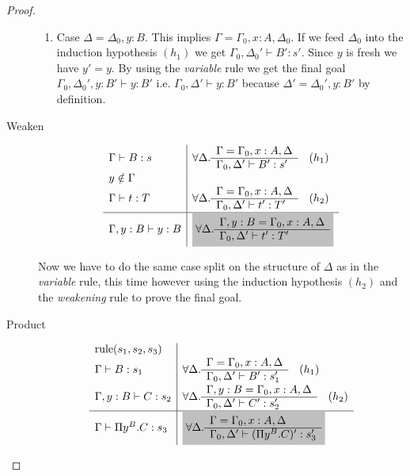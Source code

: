 \documentclass[12pt]{article}
\begin{document}
\begin{theorem}
\begin{proof}
\begin{description}
\begin{enumerate}
      \item Case $\Delta = \Delta_0,y:B$. This implies
        $\Gamma = \Gamma_0,x:A,\Delta_0$. If we feed $\Delta_0$ into the
        induction hypothesis $(h_1)$ we get
        $ \Gamma_0,\Delta_0' \vdash B': s'$. Since $y$ is fresh we have
        $y' = y$. By using the \emph{variable} rule we get the final goal
        $\Gamma_0,\Delta_0',y:B' \vdash y:B'$ i.e.
        $\Gamma_0,\Delta' \vdash y:B'$ because $\Delta' = \Delta_0',y:B'$ by
        definition.

      \end{enumerate}


    \item[Weaken]
      $$
      \begin{array}{l|l}
        \Gamma \vdash B:s
        & \forall \Delta .
          \rulev
          {\Gamma = \Gamma_0,x:A,\Delta}
          {\Gamma_0,\Delta' \vdash B' : s'} \quad(h_1)
        \\
        y \notin \Gamma
        \\
        \Gamma \vdash t:T
        & \forall \Delta .
          \rulev
          {\Gamma = \Gamma_0,x:A,\Delta}
          {\Gamma_0,\Delta' \vdash t': T'} \quad (h_2)
        \\
        \hline %
        \Gamma,y:B \vdash y:B
        & \goalbg{
          \forall \Delta .
          \rulev
          {\Gamma,y:B = \Gamma_0,x:A,\Delta}
          {\Gamma_0,\Delta' \vdash t': T'}
          }
      \end{array}
      $$

      Now we have to do the same case split on the structure of $\Delta$ as in
      the \emph{variable} rule, this time however using the induction
      hypothesis $(h_2)$ and the \emph{weakening} rule to prove the final
      goal.

    \item[Product]
      $$
      \begin{array}{l|l}
        \text{rule}(s_1,s_2,s_3)
        \\
        \Gamma \vdash B:s_1
        & \forall \Delta .
          \rulev
          {\Gamma = \Gamma_0,x:A,\Delta}
          {\Gamma_0,\Delta' \vdash B': s_1'} \quad (h_1)
        \\
        \Gamma,y:B \vdash C:s_2
        &  \forall \Delta .
          \rulev
          {\Gamma,y:B = \Gamma_0,x:A,\Delta}
          {\Gamma_0,\Delta' \vdash C': s_2'} \quad (h_2)
        \\
        \hline
        \Gamma \vdash \Pi y^B . C: s_3
        & \goalbg{
          \forall \Delta .
          \rulev
          {\Gamma = \Gamma_0,x:A,\Delta}
          {\Gamma_0,\Delta' \vdash (\Pi y^B. C)' : s_3'}
          }
      \end{array}
      $$


\end{description}
\end{proof}
\end{theorem}
\end{document}
